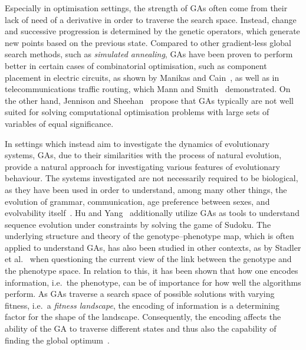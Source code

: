 \documentclass[a4paper,12pt]{article}
\theoremstyle{plain}
\theoremstyle{definition}
\begin{document}
      Especially in optimisation settings, the strength of GAs often come from their lack of need of a 
      derivative in order to traverse the search space. Instead, change and successive
      progression is determined by the genetic operators, which generate new
      points based on the previous state.  
      Compared to other gradient-less global search methods, such as
      \textit{simulated annealing}, GAs have been proven to perform
      better in certain cases of combinatorial optimisation, such as component
      placement in electric circuits, as shown by Manikas
      and Cain~\cite{ga_vs_sa}, as well as in telecommunications traffic
      routing, which Mann and Smith~\cite{Man96} demonstrated. On the other hand, Jennison and
      Sheehan~\cite{ga_bad} propose that GAs typically are not well suited for solving 
      computational optimisation problems with large sets of variables of equal significance. 
         
      In settings which instead aim to investigate the dynamics of evolutionary
      systems, GAs, due to their similarities with the process of natural evolution, 
      provide a natural approach for investigating various features of evolutionary
      behaviour. The systems investigated are not necessarily required to be biological, as
      they have been used in order to understand, among many other things, the evolution 
      of grammar, communication, age preference between sexes, and evolvability
      itself~\cite{grammatical_evolution,
      evol_of_communication,
      evol_of_female_preference,
      evol_of_evol,evol_of_evol_in_gp}. 
      Hu and Yang~\cite{sudoku} additionally utilize GAs as tools to understand sequence 
      evolution under constraints by solving the game of Sudoku. The underlying structure and theory of the genotype--phenotype map, which
      is often applied to understand GAs, has also been studied in other contexts, 
      as by Stadler et al.~\cite{topology_of_the_possible} 
      when questioning the current view of the link between the genotype and
      the phenotype space.  In relation to this, it has been shown that how one 
      encodes information, i.e.\ the phenotype, can be of importance for how well 
      the algorithms perform. As GAs traverse a search space of possible solutions with
      varying fitness, i.e.\ a \textit{fitness landscape}, the encoding of 
      information is a determining factor for the shape of the landscape.
      Consequently, the encoding affects the ability of the GA to traverse
      different states and thus also the capability of finding the global
      optimum~\cite{transforming_the_ss_with_gray}.
      
\end{document}
